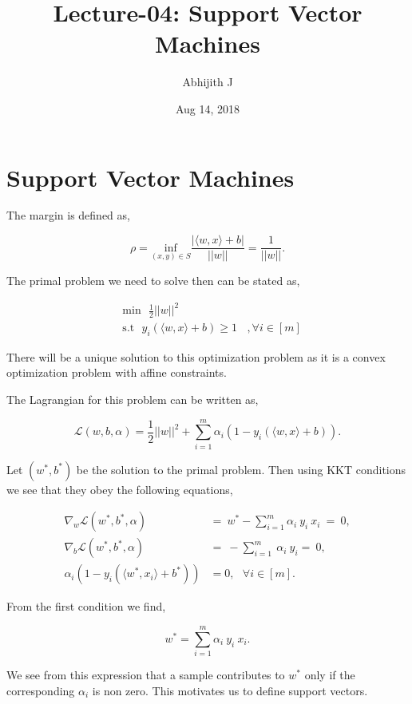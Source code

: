 \documentclass[a4paper,english,12pt]{article}
\title{Lecture-04: Support Vector Machines}
\date{Aug 14, 2018}
\author{Abhijith J}
\begin{document}
\maketitle
\section{Support Vector Machines}
The margin is defined as,

\begin{equation}
\rho = \underset{(x,y) \in S} {\mathrm{inf}} \frac{|\langle w,x \rangle + b|}{||w||} = \frac{1}{||w||}.
\end{equation}

The primal problem we need to solve then can be stated as, 

\begin{align}
&\text{min} ~~~\frac{1}{2} || w||^2\\
&\text{s.t} ~~~ y_i ( \langle w,x \rangle + b) \geq 1 ~~~~, \forall i \in [m]
\end{align}

There will be a unique solution to this optimization problem as it is a convex optimization problem with affine constraints.

The Lagrangian for this problem can be written as,

\begin{equation}
 \mathcal{L}(w,b, \alpha) = \frac{1}{2} || w||^2 +  \sum_{i = 1}^m \alpha_i (1 -  y_i ( \langle w,x \rangle + b)).
\end{equation}

Let $(w^*, b^*)$ be the solution to the primal problem. Then using KKT conditions we see that they obey the following equations,

\begin{align*}
\nabla_w \mathcal{L}(w^*, b^*, \alpha)~ &= ~ w^* -  \sum_{i =1} ^m \alpha_i~ y_i ~x_i ~=~ 0, \\
\nabla_b \mathcal{L}(w^*, b^*, \alpha)~ & = ~ - \sum_{i= 1}^m ~ \alpha_i~ y_i =~ 0, \\
\alpha_i(1- y_i(\langle w^*,x_i \rangle + b^* ))& = 0 , ~~~\forall i \in [m].
\end{align*} 

From the first condition we find,

\begin{equation}
w^* =  \sum_{i =1} ^m \alpha_i~ y_i ~x_i.
\end{equation}

We see from this expression that a sample contributes to $w^*$ only if the corresponding $\alpha_i$ is non zero. This motivates us to define support vectors.
\end{document}
